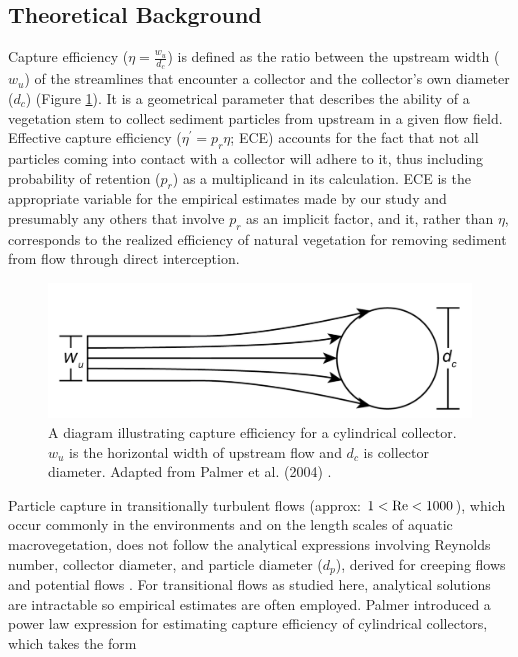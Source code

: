 \documentclass[geosciences,article,submit,moreauthors,pdftex]{Definitions/mdpi}
\begin{document}
\subsection{Theoretical Background}

Capture efficiency ($\eta=\frac{w_u}{d_c}$) is defined as the ratio between the upstream width ($w_u$) of the streamlines that encounter a collector and the collector's own diameter ($d_c$) (Figure \ref{fig:capeff}). It is a geometrical parameter that describes the ability of a vegetation stem to collect sediment particles from upstream in a given flow field. Effective capture efficiency ($\eta^\prime=p_r\eta$; ECE) accounts for the fact that not all particles coming into contact with a collector will adhere to it, thus including probability of retention ($p_r$) as a multiplicand in its calculation. ECE is the appropriate variable for the empirical estimates made by our study and presumably any others that involve $p_r$ as an implicit factor, and it, rather than $\eta$, corresponds to the realized efficiency of natural vegetation for removing sediment from flow through direct interception.

\begin{figure}[h]
\includegraphics[width=5in]{../pics/collectorefficiency.png}
\centering
\caption{A diagram illustrating capture efficiency for a cylindrical collector. $w_u$ is the horizontal width of upstream flow and $d_c$ is collector diameter. Adapted from Palmer et al. (2004) \cite{Palmer_2004}.}
\label{fig:capeff}
\end{figure}

Particle capture in transitionally turbulent flows (approx: $1<\mathrm{Re}<1000$), which occur commonly in the environments and on the length scales of aquatic macrovegetation, does not follow the analytical expressions involving Reynolds number, collector diameter, and particle diameter ($d_p$), derived for creeping flows and potential flows \cite{Palmer_2004, fuchs1965mechanics}. For transitional flows as studied here, analytical solutions are intractable so empirical estimates are often employed. Palmer \cite{Palmer_2004} introduced a power law expression for estimating capture efficiency of cylindrical collectors, which takes the form 
\end{document}
